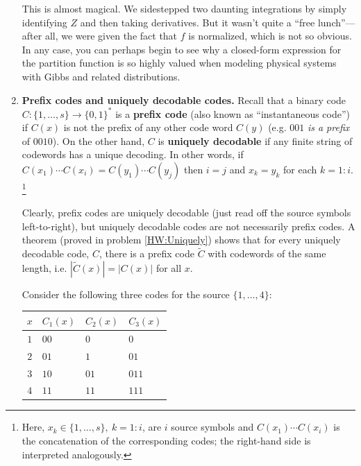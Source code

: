 \documentclass[11pt]{report}
\begin{document}
\begin{enumerate}[1.]
\begin{enumerate}[(a)]
          \end{enumerate}
          This is almost magical. We sidestepped two daunting integrations
          by simply identifying $Z$ and then taking derivatives. But it wasn't quite a ``free lunch''---after all,  we were given the fact that $f$ is normalized, which is not so obvious. In any case, you can perhaps begin to see why a closed-form expression for the partition function is so highly valued when modeling physical systems with Gibbs and related distributions.







          \pagebreak
    \item {\bf Prefix codes and uniquely decodable codes.}
          Recall that a binary code $C:\{1,\ldots,s\}\to\{0,1\}^*$ is a {\bf prefix code} (also known as ``instantaneous code'') if $C(x)$ is not the prefix of any other code word $C(y)$ (e.g. $001$ {\em is a prefix} of $0010$).
          On the other hand, $C$ is {\bf uniquely decodable}
          if any finite string of codewords has a unique decoding. In other words, if $C(x_1)\cdots C(x_i) = C(y_1)\cdots C(y_j)$ then
          $i=j$ and $x_k=y_k$ for each $k=1:i.$\footnote{Here, $x_k \in\{1,\ldots,s\},\ k=1:i$, are $i$ source symbols and $C(x_1)\cdots C(x_i)$ is the concatenation of the
              corresponding codes; the right-hand side is interpreted analogously.}

          Clearly, prefix codes are uniquely decodable (just read off the source symbols left-to-right), but uniquely decodable codes are not necessarily prefix codes. A theorem (proved in problem \ref{HW:Uniquely}) shows that for every uniquely decodable code, $C$, there is a prefix code $\tilde{C}$ with codewords of the same length, i.e. $|\tilde{C}(x)|=|C(x)|$ for all $x$.

          Consider the following three codes for the source $\{1,\ldots,4\}$:

          \begin{tabular}{c|lll}
              $x$ & $C_1(x)$ & $C_2(x)$ & $C_3(x)$ \\ \hline
              $1$ & $00$     & $0$      & $0$      \\
              $2$ & $01$     & $1$      & $01$     \\
              $3$ & $10$     & $01$     & $011$    \\
              $4$ & $11$     & $11$     & $111$
          \end{tabular}


\end{enumerate}
\end{document}

